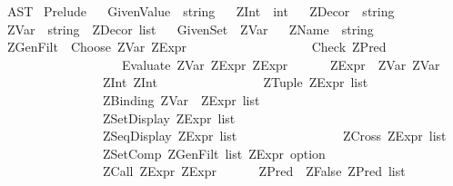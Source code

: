 %
\begin{isabellebody}%
%
%
\isadelimtheory
%
\endisadelimtheory
%
\isatagtheory
{}\isamarkupfalse%
\ AST\isanewline
{}\ Prelude\isanewline
{}%
\endisatagtheory
{\isafoldtheory}%
%
\isadelimtheory
\isanewline
%
\endisadelimtheory
\ \isanewline
{}\isamarkupfalse%
\ GivenValue\ {\isacharequal}\ string\isanewline
\ \isanewline
{}\isamarkupfalse%
\ ZInt\ {\isacharequal}\ int\isanewline
\ \isanewline
{}\isamarkupfalse%
\ ZDecor\ {\isacharequal}\ string\isanewline
\ \isanewline
{}\isamarkupfalse%
\ ZVar\ {\isacharequal}\ {\isachardoublequoteopen}string\ {\isacharasterisk}\ {\isacharparenleft}ZDecor\ list{\isacharparenright}{\isachardoublequoteclose}\isanewline
\ \isanewline
{}\isamarkupfalse%
\ GivenSet\ {\isacharequal}\ ZVar\isanewline
\ \isanewline
{}\isamarkupfalse%
\ ZName\ {\isacharequal}\ string\isanewline
\ \isanewline
{}\isamarkupfalse%
\ ZGenFilt\ {\isacharequal}\ Choose\ ZVar\ ZExpr\isanewline
\ \ \ \ \ \ \ \ \ \ \ \ \ \ \ \ \ \ {\isacharbar}\ Check\ ZPred\isanewline
\ \ \ \ \ \ \ \ \ \ \ \ \ \ \ \ \ \ {\isacharbar}\ Evaluate\ ZVar\ ZExpr\ ZExpr\isanewline
{}\ \ \ \ \ \ ZExpr\ {\isacharequal}\ ZVar\ ZVar\isanewline
\ \ \ \ \ \ \ \ \ \ \ \ \ \ \ {\isacharbar}\ ZInt\ ZInt\isanewline
\ \ \ \ \ \ \ \ \ \ \ \ \ \ \ {\isacharbar}\ ZTuple\ {\isachardoublequoteopen}ZExpr\ list{\isachardoublequoteclose}\isanewline
\ \ \ \ \ \ \ \ \ \ \ \ \ \ \ {\isacharbar}\ ZBinding\ {\isachardoublequoteopen}{\isacharparenleft}ZVar\ {\isacharasterisk}\ ZExpr{\isacharparenright}\ list{\isachardoublequoteclose}\isanewline
\ \ \ \ \ \ \ \ \ \ \ \ \ \ \ {\isacharbar}\ ZSetDisplay\ {\isachardoublequoteopen}ZExpr\ list{\isachardoublequoteclose}\isanewline
\ \ \ \ \ \ \ \ \ \ \ \ \ \ \ {\isacharbar}\ ZSeqDisplay\ {\isachardoublequoteopen}ZExpr\ list{\isachardoublequoteclose}\isanewline
\ \ \ \ \ \ \ \ \ \ \ \ \ \ \ {\isacharbar}\ ZCross\ {\isachardoublequoteopen}ZExpr\ list{\isachardoublequoteclose}\isanewline
\ \ \ \ \ \ \ \ \ \ \ \ \ \ \ {\isacharbar}\ ZSetComp\ {\isachardoublequoteopen}ZGenFilt\ list{\isachardoublequoteclose}\ {\isachardoublequoteopen}ZExpr\ option{\isachardoublequoteclose}\isanewline
\ \ \ \ \ \ \ \ \ \ \ \ \ \ \ {\isacharbar}\ ZCall\ ZExpr\ ZExpr\isanewline
{}\ \ \ \ \ \ ZPred\ {\isacharequal}\ ZFalse\ {\isachardoublequoteopen}ZPred\ list{\isachardoublequoteclose}\isanewline

\end{isabellebody}
